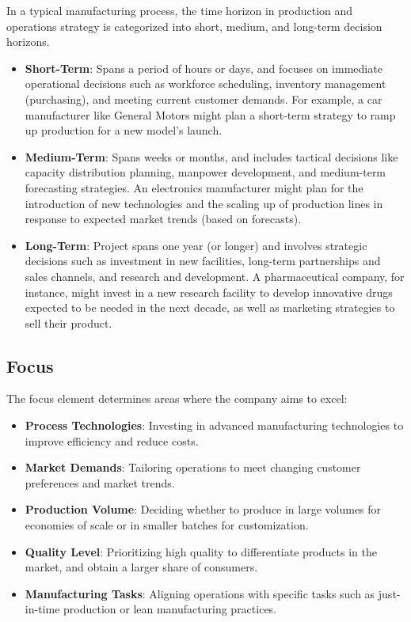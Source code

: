 \documentclass[12pt]{article}
\begin{document}
In a typical manufacturing process, the time horizon in production and operations strategy is categorized into short, medium, and long-term decision horizons. \begin{itemize}
    \item \textbf{Short-Term}: Spans a period of hours or days, and focuses on immediate operational decisions such as workforce scheduling, inventory management (purchasing), and meeting current customer demands. For example, a car manufacturer like General Motors might plan a short-term strategy to ramp up production for a new model's launch.
    \item \textbf{Medium-Term}: Spans weeks or months, and includes tactical decisions like capacity distribution planning, manpower development, and medium-term forecasting strategies. An electronics manufacturer might plan for the introduction of new technologies and the scaling up of production lines in response to expected market trends (based on forecasts).
    \item \textbf{Long-Term}: Project spans one year (or longer) and involves strategic decisions such as investment in new facilities, long-term partnerships and sales channels, and research and development. A pharmaceutical company, for instance, might invest in a new research facility to develop innovative drugs expected to be needed in the next decade, as well as marketing strategies to sell their product.
\end{itemize}

\subsection*{Focus}

The focus element determines areas where the company aims to excel: \begin{itemize}
    \item \textbf{Process Technologies}: Investing in advanced manufacturing technologies to improve efficiency and reduce costs. 
    \item \textbf{Market Demands}: Tailoring operations to meet changing customer preferences and market trends. 
    \item \textbf{Production Volume}: Deciding whether to produce in large volumes for economies of scale or in smaller batches for customization. 
    \item \textbf{Quality Level}: Prioritizing high quality to differentiate products in the market, and obtain a larger share of consumers. 
    \item \textbf{Manufacturing Tasks}: Aligning operations with specific tasks such as just-in-time production or lean manufacturing practices.
\end{itemize}
\end{document}
